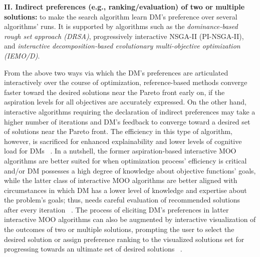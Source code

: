\documentclass{sfuthesis}
\begin{document}
\textbf{II. Indirect preferences (e.g., ranking/evaluation) of two or multiple solutions:} to make the search algorithm learn DM’s preference over several algorithms’ runs. It is supported by algorithms such as the \textit{dominance-based rough set approach (DRSA)}, progressively interactive NSGA-II (PI-NSGA-II), and \textit{interactive decomposition-based evolutionary multi-objective optimization (IEMO/D)}.\par
From the above two ways via which the DM’s preferences are articulated interactively over the course of optimization, reference-based methods converge faster toward the desired solutions near the Pareto front early on, if the aspiration levels for all objectives are accurately expressed. On the other hand, interactive algorithms requiring the declaration of indirect preferences may take a higher number of iterations and DM’s feedback to converge toward a desired set of solutions near the Pareto front. The efficiency in this type of algorithm, however, is sacrificed for enhanced explainability and lower levels of cognitive load for DMs ~\cite{taylor2021bayesian}. In a nutshell, the former aspiration-based interactive MOO algorithms are better suited for when optimization process’ efficiency is critical and/or DM possesses a high degree of knowledge about objective functions’ goals, while the latter class of interactive MOO algorithms are better aligned with circumstances in which DM has a lower level of knowledge and expertise about the problem’s goals; thus, needs careful evaluation of recommended solutions after every iteration ~\cite{taylor2021bayesian}. The process of eliciting DM’s preferences in latter interactive MOO algorithms can also be augmented by interactive visualization of the outcomes of two or multiple solutions, prompting the user to select the desired solution or assign preference ranking to the visualized solutions set for progressing towards an ultimate set of desired solutions ~\cite{thiele2009preference}.
\end{document}
